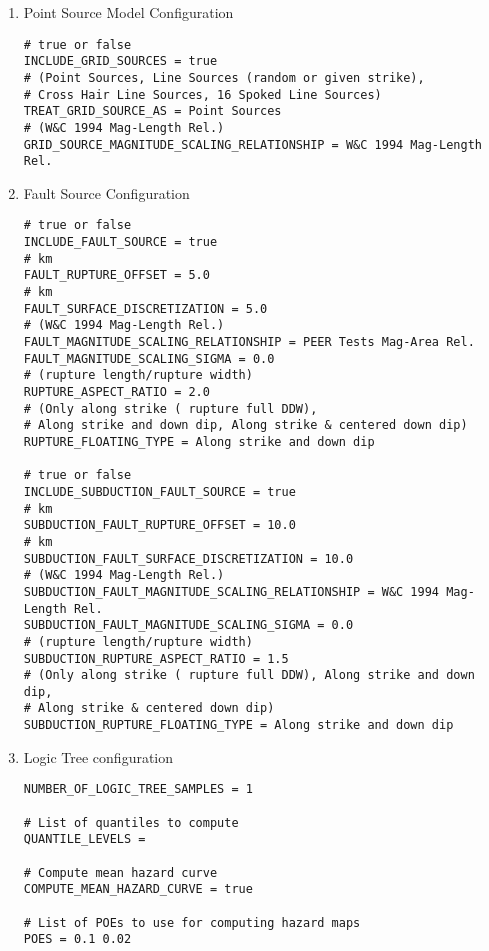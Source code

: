 \begin{enumerate}
\item Point Source Model Configuration
\begin{Verbatim}[frame=single, commandchars=\\\{\}, fontsize=\small]
# true or false
INCLUDE_GRID_SOURCES = true
# (Point Sources, Line Sources (random or given strike), 
# Cross Hair Line Sources, 16 Spoked Line Sources)
TREAT_GRID_SOURCE_AS = Point Sources
# (W&C 1994 Mag-Length Rel.)
GRID_SOURCE_MAGNITUDE_SCALING_RELATIONSHIP = W&C 1994 Mag-Length Rel.
\end{Verbatim}
%
\item Fault Source Configuration
\begin{Verbatim}[frame=single, commandchars=\\\{\}, fontsize=\small]
# true or false
INCLUDE_FAULT_SOURCE = true
# km
FAULT_RUPTURE_OFFSET = 5.0
# km
FAULT_SURFACE_DISCRETIZATION = 5.0
# (W&C 1994 Mag-Length Rel.)
FAULT_MAGNITUDE_SCALING_RELATIONSHIP = PEER Tests Mag-Area Rel.
FAULT_MAGNITUDE_SCALING_SIGMA = 0.0
# (rupture length/rupture width)
RUPTURE_ASPECT_RATIO = 2.0
# (Only along strike ( rupture full DDW), 
# Along strike and down dip, Along strike & centered down dip)
RUPTURE_FLOATING_TYPE = Along strike and down dip

# true or false
INCLUDE_SUBDUCTION_FAULT_SOURCE = true
# km
SUBDUCTION_FAULT_RUPTURE_OFFSET = 10.0
# km
SUBDUCTION_FAULT_SURFACE_DISCRETIZATION = 10.0
# (W&C 1994 Mag-Length Rel.)
SUBDUCTION_FAULT_MAGNITUDE_SCALING_RELATIONSHIP = W&C 1994 Mag-Length Rel.
SUBDUCTION_FAULT_MAGNITUDE_SCALING_SIGMA = 0.0
# (rupture length/rupture width)
SUBDUCTION_RUPTURE_ASPECT_RATIO = 1.5
# (Only along strike ( rupture full DDW), Along strike and down dip, 
# Along strike & centered down dip)
SUBDUCTION_RUPTURE_FLOATING_TYPE = Along strike and down dip
\end{Verbatim}
%
\item Logic Tree configuration
\begin{Verbatim}[frame=single, commandchars=\\\{\}, fontsize=\small]
 NUMBER_OF_LOGIC_TREE_SAMPLES = 1

# List of quantiles to compute
QUANTILE_LEVELS =

# Compute mean hazard curve
COMPUTE_MEAN_HAZARD_CURVE = true

# List of POEs to use for computing hazard maps
POES = 0.1 0.02
\end{Verbatim}
\end{enumerate}


